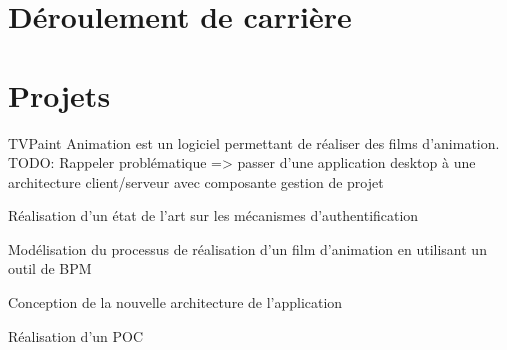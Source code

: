 \documentclass[]{deedy-resume-openfont}
\begin{document}
%
%

%
%

%
%


\section{Déroulement de carrière}

\sectionsep

\sectionsep

\sectionsep

\sectionsep

\section{Projets}

TVPaint Animation est un logiciel permettant de réaliser des films d'animation.\\
TODO: Rappeler problématique => passer d'une application desktop à une architecture client/serveur avec composante gestion de projet
\begin{tightemize}
\item Réalisation d'un état de l'art sur les mécanismes d'authentification
\item Modélisation du processus de réalisation d'un film d'animation en utilisant un outil de BPM
\item Conception de la nouvelle architecture de l'application
\item Réalisation d'un POC
\end{tightemize}
\sectionsep
\end{document}
